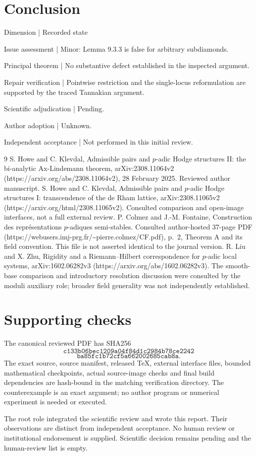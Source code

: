 \documentclass[10pt]{article}
\begin{document}
\section*{Conclusion}
Dimension | Recorded state\par
Issue assessment | Minor: Lemma 9.3.3 is false for arbitrary subdiamonds.\par
Principal theorem | No substantive defect established in the inspected argument.\par
Repair verification | Pointwise restriction and the single-locus reformulation are supported by the traced Tannakian argument.\par
Scientific adjudication | Pending.\par
Author adoption | Unknown.\par
Independent acceptance | Not performed in this initial review.\par
9 S. Howe and C. Klevdal, Admissible pairs and \(p\)-adic Hodge structures II: the bi-analytic Ax-Lindemann theorem, arXiv:2308.11064v2 (https://arxiv.org/abs/2308.11064v2), 28 February 2025. Reviewed author manuscript. S. Howe and C. Klevdal, Admissible pairs and \(p\)-adic Hodge structures I: transcendence of the de Rham lattice, arXiv:2308.11065v2 (https://arxiv.org/html/2308.11065v2). Consulted comparison and open-image interfaces, not a full external review. P. Colmez and J.-M. Fontaine, Construction des représentations \(p\)-adiques semi-stables. Consulted author-hosted 37-page PDF (https://webusers.imj-prg.fr/\textasciitilde{}pierre.colmez/CF.pdf), p. 2, Theorem A and its field convention. This file is not asserted identical to the journal version. R. Liu and X. Zhu, Rigidity and a Riemann–Hilbert correspondence for \(p\)-adic local systems, arXiv:1602.06282v3 (https://arxiv.org/abs/1602.06282v3). The smooth-base comparison and introductory resolution discussion were consulted by the moduli auxiliary role; broader field generality was not independently established.\par
\section*{Supporting checks}
The canonical reviewed PDF has SHA256 \[\texttt{c133b06bec1209a04f84d1c2984b78ce2242}\] \[\texttt{ba85fc1b72cf5a662002685cab8a}.\] The exact source, source manifest, released TeX, external interface files, bounded mathematical checkpoints, actual source-image checks and final build dependencies are hash-bound in the matching verification directory. The counterexample is an exact argument; no author program or numerical experiment is needed or executed.\par
The root role integrated the scientific review and wrote this report. Their observations are distinct from independent acceptance. No human review or institutional endorsement is supplied. Scientific decision remains pending and the human-review list is empty.\par
\end{document}
